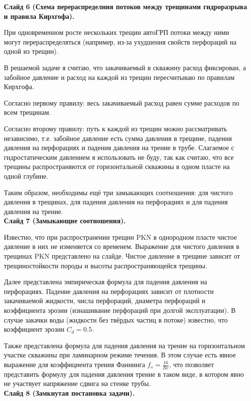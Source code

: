 \documentclass[a4paper, 12pt]{article}
\begin{document}
\textbf{Слайд 6 (Схема перераспределния потоков между трещинами гидроразрыва и правила Кирхгофа).}

При одновременном росте нескольких трещин автоГРП потоки между ними могут перераспределяться (например, из-за ухудшения свойств перфораций на одной из трещин).

В решаемой задаче я считаю, что закачиваемый в скважину расход фиксирован, а забойное давление и расход на каждой из трещин пересчитываю по правилам Кирхгофа.

Согласно первому правилу: весь закачиваемый расход равен сумме расходов по всем трещинам.

Согласно второму правилу: путь к каждой из трещин можно рассматривать независимо, т.е. забойное давление есть сумма давления в трещине, падения давления на перфорациях и падения давления на трение в трубе.
Слагаемое с гидростатическим давлением я использовать не буду, так как считаю, что все трещины распространяются от горизонтальной скважины в одном пласте на одной глубине.

Таким образом, необходимы ещё три замыкающих соотношения: для чистого давления в трещинах, для падения давления на перфорациях и для падения давления на трение.
\\


\textbf{Слайд 7 (Замыкающие соотношения).}

Известно, что при распространении трещин PKN в однородном пласте чистое давление в них не изменяется со временем.
Выражение для чистого давления в трещинах PKN представлено на слайде. Чистое давление в трещине зависит от трещиностойкости породы и высоты распространяющейся трещины.

Далее представлена эмпирическая формула для падения давления на перфорациях.
Падение давления на перфорациях зависит от плотности закачиваемой жидкости, числа перфораций, диаметра перфораций и коэффициента эрозии (изнашивание перфораций при долгой эксплуатации).
В случае закачки воды (жидкости без твёрдых частиц в потоке) известно, что коэффициент эрозии $C_d=0.5$.

Также представлена формула для падения давления на трение на горизонтальном участке скважины при ламинарном режиме течения.
В этом случае есть явное выражение для коэффициента трения Фаннинга $f_s=\frac{16}{Re}$, что позволяет представить формулу для падения давления трение в таком виде, в котором явно не участвует напряжение сдвига на стенке трубы.
\\


\textbf{Слайд 8 (Замкнутая постановка задачи).}
\end{document}
